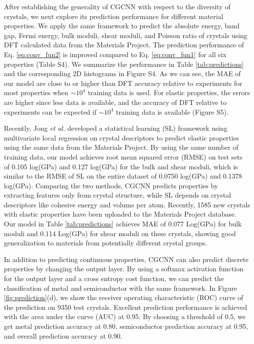 \documentclass[twocolumn, prl]{revtex4-1}
\begin{document}
After establishing the generality of CGCNN with respect to the diversity of crystals, we next explore its prediction performance for different material properties. We apply the same framework to predict the absolute energy, band gap, Fermi energy, bulk moduli, shear moduli, and Poisson ratio of crystals using DFT calculated data from the Materials Project\cite{jain2013commentary}. The prediction performance of Eq. \ref{eq:conv_fun2} is improved compared to Eq. \ref{eq:conv_fun1} for all six properties (Table S4). We summarize the performance in Table \ref{tab:predictions} and the corresponding 2D histograms in Figure S4. As we can see, the MAE of our model are close to or higher than DFT accuracy relative to experiments for most properties when ${\sim}10^4$ training data is used. For elastic properties, the errors are higher since less data is available, and the accuracy of DFT relative to experiments can be expected if ${\sim}10^4$ training data is available (Figure S5). 

Recently, Jong \textit{et al.}\cite{de2016statistical} developed a statistical learning (SL) framework using multivariate local regression on crystal descriptors to predict elastic properties using the same data from the Materials Project. By using the same number of training data, our model achieves root mean squared error (RMSE) on test sets of 0.105 log(GPa) and 0.127 log(GPa) for the bulk and shear moduli, which is similar to the RMSE of SL on the entire dataset of 0.0750 log(GPa) and 0.1378 log(GPa). Comparing the two methods, CGCNN predicts properties by extracting features only from crystal structure, while SL depends on crystal descriptors like cohesive energy and volume per atom. Recently, 1585 new crystals with elastic properties have been uploaded to the Materials Project database. Our model in Table \ref{tab:predictions} achieves MAE of 0.077 Log(GPa) for bulk moduli and 0.114 Log(GPa) for shear moduli on these crystals, showing good generalization to materials from potentially different crystal groups.

In addition to predicting continuous properties, CGCNN can also predict discrete properties by changing the output layer. By using a softmax activation function for the output layer and a cross entropy cost function, we can predict the classification of metal and semiconductor with the same framework. In Figure \ref{fig:prediction}(d), we show the receiver operating characteristic (ROC) curve of the prediction on 9350 test crystals. Excellent prediction performance is achieved with the area under the curve (AUC) at 0.95. By choosing a threshold of 0.5, we get metal prediction accuracy at 0.80, semiconductor prediction accuracy at 0.95, and overall prediction accuracy at 0.90. 
\end{document}
